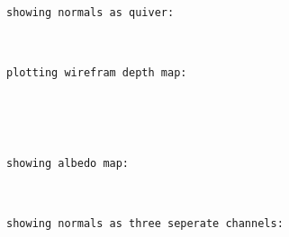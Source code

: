 \documentclass[11pt]{article}
\begin{document}
    \begin{Verbatim}[commandchars=\\\{\}]
showing normals as quiver:
\end{Verbatim}

    \begin{center}
    \end{center}
    { \hspace*{\fill} \\}
    
    \begin{Verbatim}[commandchars=\\\{\}]
plotting wirefram depth map:
\end{Verbatim}

    \begin{center}
    \end{center}
    { \hspace*{\fill} \\}
    
    \begin{center}
    \end{center}
    { \hspace*{\fill} \\}
    
    \begin{Verbatim}[commandchars=\\\{\}]
showing albedo map:
\end{Verbatim}

    \begin{center}
    \end{center}
    { \hspace*{\fill} \\}
    
    \begin{Verbatim}[commandchars=\\\{\}]
showing normals as three seperate channels:
\end{Verbatim}

    \begin{center}
    \end{center}
    { \hspace*{\fill} \\}
    
\end{document}
